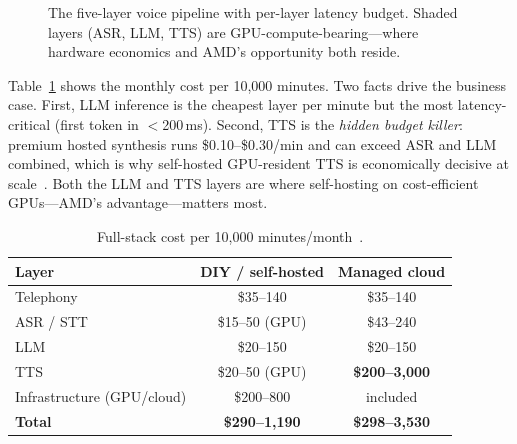 \documentclass[blind]{gtac}
\begin{document}
\begin{figure}[H]
\centering
{}
\caption{The five-layer voice pipeline with per-layer latency budget. Shaded layers
(ASR, LLM, TTS) are GPU-compute-bearing---where hardware economics and AMD's
opportunity both reside.}
\label{fig:pipe}
\end{figure}

Table~\ref{tab:stackcost} shows the monthly cost per 10{,}000 minutes. Two facts drive the business case. First, LLM inference is the cheapest layer per minute but the most latency-critical (first token in $<$200\,ms). Second, TTS is the \emph{hidden budget killer}: premium hosted synthesis runs \$0.10--\$0.30/min and can exceed ASR and LLM combined, which is why self-hosted GPU-resident TTS is economically decisive at scale~\cite{bentoml_tts,raftlabs_cost}. Both the LLM and TTS layers are where self-hosting on cost-efficient GPUs---AMD's advantage---matters most.

\begin{table}[H]
\centering
\caption{Full-stack cost per 10{,}000 minutes/month~\cite{raftlabs_cost,bentoml_tts}.}
\label{tab:stackcost}
\tiny
\begin{tabular}{@{}lcc@{}}
\toprule
Layer & DIY / self-hosted & Managed cloud \\
\midrule
Telephony & \$35--140 & \$35--140 \\
ASR / STT & \$15--50 (GPU) & \$43--240 \\
LLM & \$20--150 & \$20--150 \\
TTS & \$20--50 (GPU) & \textbf{\$200--3{,}000} \\
Infrastructure (GPU/cloud) & \$200--800 & included \\
\midrule
\textbf{Total} & \textbf{\$290--1{,}190} & \textbf{\$298--3{,}530} \\
\bottomrule
\end{tabular}
\end{table}
\end{document}
